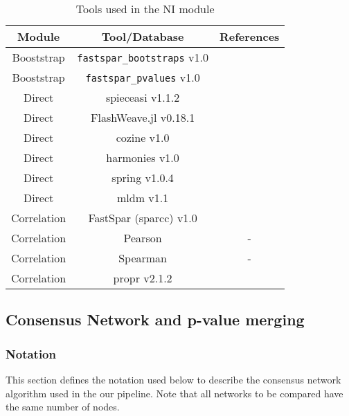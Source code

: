   \begin{table}[h]
    \centering
    \small
    \begin{tabular}{|c|c|c|}
      \hline
      \textbf{Module} & \textbf{Tool/Database} & \textbf{References} \\
      \hline
      Booststrap & \texttt{fastspar\_bootstraps} v1.0 & \cite{Watts2018} \\
      Booststrap & \texttt{fastspar\_pvalues} v1.0 & \cite{Watts2018} \\
      \hline
      Direct & \ac{spieceasi} v1.1.2 & \cite{Kurtz2015} \\
      Direct & FlashWeave.jl v0.18.1 & \cite{tackmannRapidInferenceDirect2019} \\
      Direct & \ac{cozine} v1.0 & \cite{haCompositionalZeroinflatedNetwork2020a} \\
      Direct & \ac{harmonies} v1.0 & \cite{jiangHARMONIESHybridApproach2020} \\
      Direct & \ac{spring} v1.0.4 & \cite{yoonMicrobialNetworksSPRING2019} \\
      Direct & \ac{mldm} v1.1 & \cite{Yang2017} \\
      \hline
      Correlation & FastSpar (\ac{sparcc}) v1.0 & \cite{Watts2018} \\
      Correlation & Pearson & - \\
      Correlation & Spearman & - \\
      Correlation & propr v2.1.2 & \cite{quinnProprRpackageIdentifying2017} \\
      \hline
    \end{tabular}
    \caption{Tools used in the NI module}
    \label{tab:ni_tools}
  \end{table}


  \subsection*{Consensus Network and p-value merging}
  \vspace{-5mm}

 \subsubsection*{Notation}

  This section defines the notation used below to describe the consensus network algorithm used in the our pipeline. Note that all networks to be compared have the same number of nodes.

